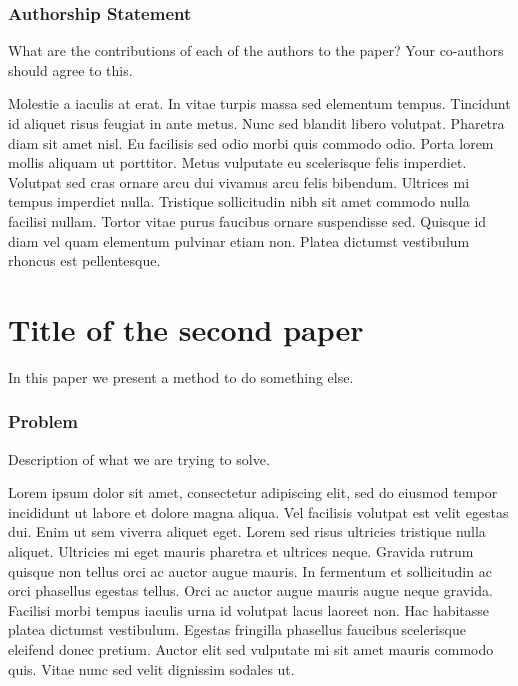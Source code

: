\ifx\authorshipStatementSection\undefined
\subsubsection*{Authorship Statement}


What are the contributions of each of the authors to the paper? Your co-authors should agree to this. 

\vskip 1cm

Molestie a iaculis at erat. In vitae turpis massa sed elementum tempus. Tincidunt id aliquet risus feugiat in ante metus. Nunc sed blandit libero volutpat. Pharetra diam sit amet nisl. Eu facilisis sed odio morbi quis commodo odio. Porta lorem mollis aliquam ut porttitor. Metus vulputate eu scelerisque felis imperdiet. Volutpat sed cras ornare arcu dui vivamus arcu felis bibendum. Ultrices mi tempus imperdiet nulla. Tristique sollicitudin nibh sit amet commodo nulla facilisi nullam. Tortor vitae purus faucibus ornare suspendisse sed. Quisque id diam vel quam elementum pulvinar etiam non. Platea dictumst vestibulum rhoncus est pellentesque.

\fi

\clearpage

\section{Title of the second paper}

In this paper we present a method to do something else.


\subsubsection*{Problem}

Description of what we are trying to solve.

\vskip 1cm

Lorem ipsum dolor sit amet, consectetur adipiscing elit, sed do eiusmod tempor incididunt ut labore et dolore magna aliqua. Vel facilisis volutpat est velit egestas dui. Enim ut sem viverra aliquet eget. Lorem sed risus ultricies tristique nulla aliquet. Ultricies mi eget mauris pharetra et ultrices neque. Gravida rutrum quisque non tellus orci ac auctor augue mauris. In fermentum et sollicitudin ac orci phasellus egestas tellus. Orci ac auctor augue mauris augue neque gravida. Facilisi morbi tempus iaculis urna id volutpat lacus laoreet non. Hac habitasse platea dictumst vestibulum. Egestas fringilla phasellus faucibus scelerisque eleifend donec pretium. Auctor elit sed vulputate mi sit amet mauris commodo quis. Vitae nunc sed velit dignissim sodales ut.



